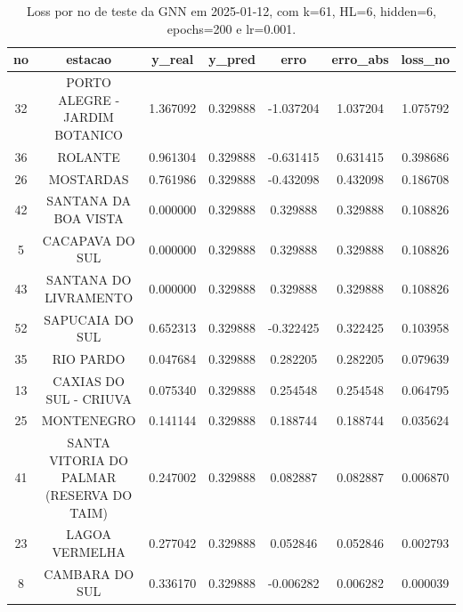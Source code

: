 \begin{table}[h]
\centering
\caption{Loss por no de teste da GNN em 2025-01-12, com k=61, HL=6, hidden=6, epochs=200 e lr=0.001.}
\label{tab:gnn_loss_k61_hl6_h6_e200_d20250112}
\begin{tabular}{ccccccc}
\toprule
no & estacao & y\_real & y\_pred & erro & erro\_abs & loss\_no \\
\midrule
32 & PORTO ALEGRE - JARDIM BOTANICO & 1.367092 & 0.329888 & -1.037204 & 1.037204 & 1.075792 \\
36 & ROLANTE & 0.961304 & 0.329888 & -0.631415 & 0.631415 & 0.398686 \\
26 & MOSTARDAS & 0.761986 & 0.329888 & -0.432098 & 0.432098 & 0.186708 \\
42 & SANTANA DA BOA VISTA & 0.000000 & 0.329888 & 0.329888 & 0.329888 & 0.108826 \\
5 & CACAPAVA DO SUL & 0.000000 & 0.329888 & 0.329888 & 0.329888 & 0.108826 \\
43 & SANTANA DO LIVRAMENTO & 0.000000 & 0.329888 & 0.329888 & 0.329888 & 0.108826 \\
52 & SAPUCAIA DO SUL & 0.652313 & 0.329888 & -0.322425 & 0.322425 & 0.103958 \\
35 & RIO PARDO & 0.047684 & 0.329888 & 0.282205 & 0.282205 & 0.079639 \\
13 & CAXIAS DO SUL - CRIUVA & 0.075340 & 0.329888 & 0.254548 & 0.254548 & 0.064795 \\
25 & MONTENEGRO & 0.141144 & 0.329888 & 0.188744 & 0.188744 & 0.035624 \\
41 & SANTA VITORIA DO PALMAR (RESERVA DO TAIM) & 0.247002 & 0.329888 & 0.082887 & 0.082887 & 0.006870 \\
23 & LAGOA VERMELHA & 0.277042 & 0.329888 & 0.052846 & 0.052846 & 0.002793 \\
8 & CAMBARA DO SUL & 0.336170 & 0.329888 & -0.006282 & 0.006282 & 0.000039 \\
\bottomrule
\end{tabular}
\end{table}
